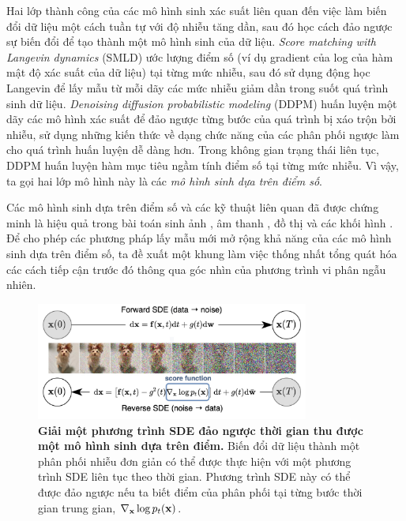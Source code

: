 \documentclass{article} %
\begin{document}
Hai lớp thành công của các mô hình sinh xác suất liên quan đến việc làm biến đổi dữ liệu một cách tuần tự với độ nhiễu tăng dần, sau đó học cách đảo ngược sự biến đổi để tạo thành một mô hình sinh của dữ liệu.
\textit{Score matching with Langevin dynamics} (SMLD) \citep{song2019generative} ước lượng điểm số (ví dụ gradient của log của hàm mật độ xác suất của dữ liệu) tại từng mức nhiễu, sau đó sử dụng động học Langevin để lấy mẫu từ mỗi dãy các mức nhiễu giảm dần trong suốt quá trình sinh dữ liệu.
\textit{Denoising diffusion probabilistic modeling} (DDPM) \citep{sohl2015deep,ho2020denoising} huấn luyện một dãy các mô hình xác suất để đảo ngược từng bước của quá trình bị xáo trộn bởi nhiễu,
sử dụng những kiến thức về dạng chức năng của các phân phối ngược làm cho quá trình huấn luyện dễ dàng hơn.
Trong không gian trạng thái liên tục, DDPM huấn luyện hàm mục tiêu ngầm tính điểm số tại từng mức nhiễu.
Vì vậy, ta gọi hai lớp mô hình này là các \textit{mô hình sinh dựa trên điểm số}.

Các mô hình sinh dựa trên điểm số và các kỹ thuật liên quan \citep{bordes2017learning, goyal2017variational,du2019implicit} đã được chứng minh là hiệu quả trong bài toán sinh ảnh \citep{song2019generative,song2020sliced,ho2020denoising}, âm thanh \citep{chen2020wavegrad,kong2020diffwave}, đồ thị \citep{niu2020permutation} và các khối hình \citep{cai2020learning}.
Để cho phép các phương pháp lấy mẫu mới mở rộng khả năng của các mô hình sinh dựa trên điểm số, ta đề xuất một khung làm việc thống nhất tổng quát hóa các cách tiếp cận trước đó thông qua góc nhìn của phương trình vi phân ngẫu nhiên.

\begin{figure}[h!]
    \centering
    \includegraphics[width=0.8\textwidth]{1.jpg}
    \caption{\textbf{Giải một phương trình SDE đảo ngược thời gian thu được một mô hình sinh dựa trên điểm.}
    Biến đổi dữ liệu thành một phân phối nhiễu đơn giản có thể được thực hiện với một phương trình SDE liên tục theo thời gian.
    Phương trình SDE này có thể được đảo ngược nếu ta biết điểm của phân phối tại từng bước thời gian trung gian, $\nabla_{\bold{x}}\log p_t (\bold{x})$.}
    \label{fig:1}
\end{figure}
\end{document}
